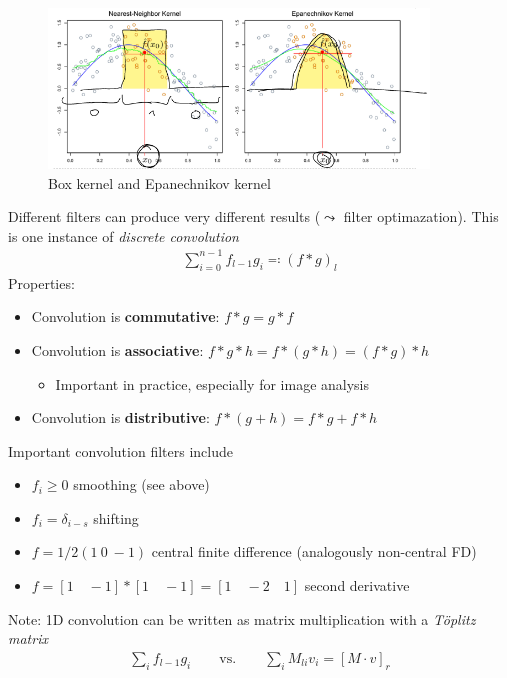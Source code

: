 \begin{figure}[htpb]
  \centering \includegraphics[width=0.9\textwidth,trim={0 1mm 0
    0},clip]{Figures/convolution_weight_examples.png}
  \caption{Box kernel and Epanechnikov kernel}%
  \label{fig:conv:kernel}
\end{figure}

Different filters can produce very different results ($\leadsto$ filter
optimazation). This is one instance of \emph{discrete convolution}
\begin{gather*}
  \sum_{i=0}^{n-1}f_{l-1}g_i \eqqcolon (f \ast g)_l
\end{gather*}
Properties:
\begin{itemize}
\item Convolution is \textbf{commutative}: $f \ast g = g \ast f$
\item Convolution is \textbf{associative}:
  $f \ast g \ast h = f \ast (g \ast h) = (f \ast g) \ast h$
  \begin{itemize}
  \item Important in practice, especially for image analysis
  \end{itemize}
\item Convolution is \textbf{distributive}:
  $f \ast (g + h) = f \ast g + f \ast h$
\end{itemize}
Important convolution filters include
\begin{itemize}
\item $f_i \ge 0$ smoothing (see above)
\item $f_i = \delta_{i-s}$ shifting
\item $f = 1/2(1 \ 0 \ -1)$ central finite difference (analogously non-central
  FD)
\item $f = [1\quad -1] \ast [1\quad -1] = [1\quad -2\quad 1]$ second derivative
\end{itemize}
Note: 1D convolution can be written as matrix multiplication with a
\emph{Töplitz matrix}
\begin{gather*}
  \sum_i f_{l-1}g_i \qquad \text{vs.} \qquad \sum_i M_{li}v_i = [M\cdot v]_r
\end{gather*}
